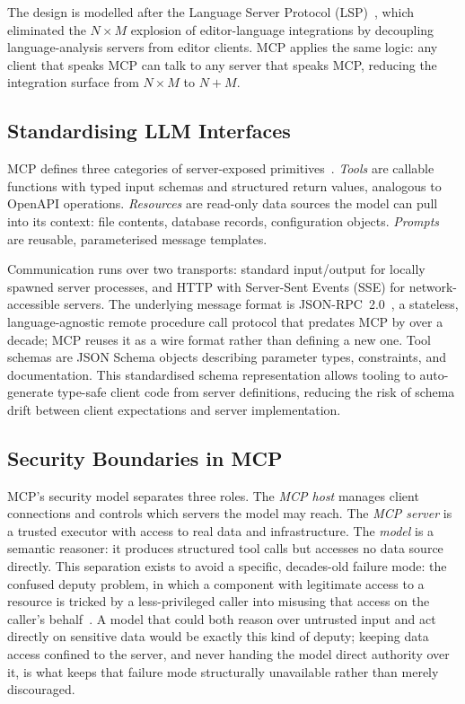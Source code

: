 The design is modelled after the Language Server Protocol (LSP)~\cite{microsoft2024lsp,bunder2019decoupling}, which eliminated the $N \times M$ explosion of editor-language integrations by decoupling language-analysis servers from editor clients. MCP applies the same logic: any client that speaks MCP can talk to any server that speaks MCP, reducing the integration surface from $N \times M$ to $N + M$.

\subsection{Standardising LLM Interfaces}
\label{subsec:background_mcp_standardization}

MCP defines three categories of server-exposed primitives~\cite{anthropic2024mcp}. \emph{Tools} are callable functions with typed input schemas and structured return values, analogous to OpenAPI operations. \emph{Resources} are read-only data sources the model can pull into its context: file contents, database records, configuration objects. \emph{Prompts} are reusable, parameterised message templates.

Communication runs over two transports: standard input/output for locally spawned server processes, and HTTP with Server-Sent Events (SSE) for network-accessible servers. The underlying message format is JSON-RPC~2.0~\cite{jsonrpc2010spec}, a stateless, language-agnostic remote procedure call protocol that predates MCP by over a decade; MCP reuses it as a wire format rather than defining a new one. Tool schemas are JSON Schema objects describing parameter types, constraints, and documentation. This standardised schema representation allows tooling to auto-generate type-safe client code from server definitions, reducing the risk of schema drift between client expectations and server implementation.

\subsection{Security Boundaries in MCP}
\label{subsec:background_mcp_security}

MCP's security model separates three roles. The \emph{MCP host} manages client connections and controls which servers the model may reach. The \emph{MCP server} is a trusted executor with access to real data and infrastructure. The \emph{model} is a semantic reasoner: it produces structured tool calls but accesses no data source directly. This separation exists to avoid a specific, decades-old failure mode: the confused deputy problem, in which a component with legitimate access to a resource is tricked by a less-privileged caller into misusing that access on the caller's behalf~\cite{hardy1988confuseddeputy}. A model that could both reason over untrusted input and act directly on sensitive data would be exactly this kind of deputy; keeping data access confined to the server, and never handing the model direct authority over it, is what keeps that failure mode structurally unavailable rather than merely discouraged.

